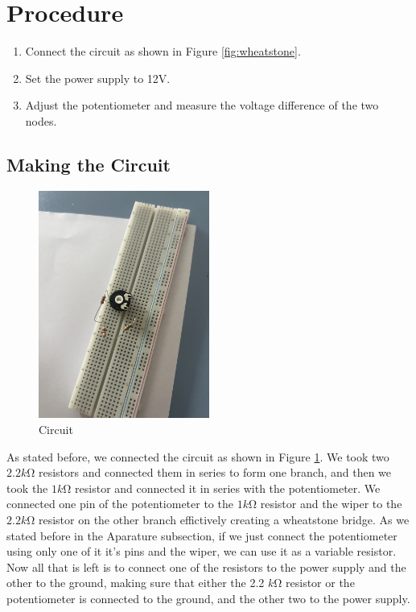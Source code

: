 \documentclass[a4paper, 10pt]{article}
\begin{document}
	\pagebreak
	\section{Procedure}
		\begin{enumerate}
			\item Connect the circuit as shown in Figure \ref{fig:wheatstone}.
			\item Set the power supply to 12V.
			\item Adjust the potentiometer and measure the voltage difference of the two nodes.
		\end{enumerate}

		\subsection{Making the Circuit}
			\begin{figure}[h!]
				\centering
				\includegraphics[width=0.5\textwidth]{images/Circuit.jpeg}
				\caption{Circuit}
				\label{fig:circuit}
			\end{figure}

			As stated before, we connected the circuit as shown in Figure \ref{fig:circuit}.
			We took two $2.2 k\si{\ohm}$ resistors and connected them in series to form one branch,
			and then we took the $1 k\si{\ohm}$ resistor and connected it in series with the potentiometer.
			We connected one pin of the potentiometer to the $1 k\si{\ohm}$ resistor and the 
			wiper to the $2.2 k\si{\ohm}$ resistor on the other branch effictively creating a wheatstone bridge.
			As we stated before in the Aparature subsection, if we just connect the potentiometer using only one
			of it it's pins and the wiper, we can use it as a variable resistor. Now all that is left is to connect
			one of the resistors to the power supply and the other to the ground, making sure that
			either the 2.2 $k$\si{\ohm} resistor or the potentiometer is connected to the ground,
			and the other two to the power supply.
			
\end{document}
